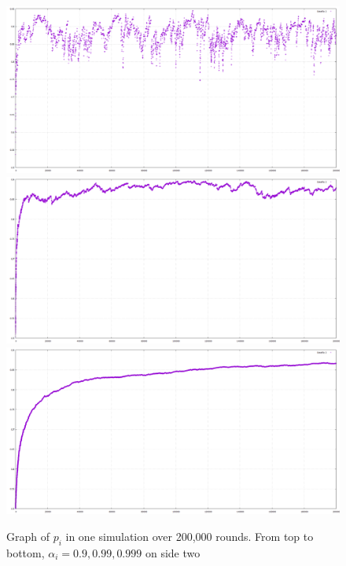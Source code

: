 \documentclass{article}
\begin{document}
\begin{figure}[htp]
\centering
\includegraphics[width=.8\textwidth]{images/ai9side2x200000}\hfill
\includegraphics[width=.8\textwidth]{images/ai99side2x200000}\hfill
\includegraphics[width=.8\textwidth]{images/ai999side2x200000}
\caption{Graph of $p_i$ in one simulation over 200,000 rounds. From top to bottom, $\alpha_i = 0.9, 0.99, 0.999$ on side two}
\label{fig:figure3}
\end{figure}
\end{document}
